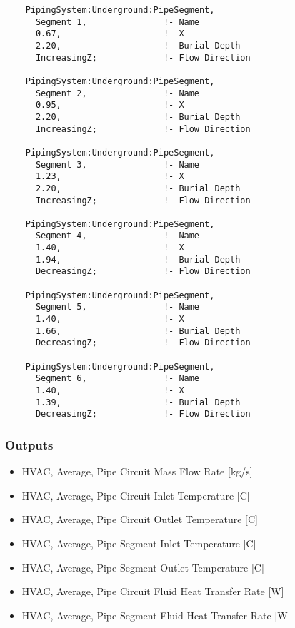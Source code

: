 \begin{lstlisting}
    PipingSystem:Underground:PipeSegment,
      Segment 1,               !- Name
      0.67,                    !- X
      2.20,                    !- Burial Depth
      IncreasingZ;             !- Flow Direction

    PipingSystem:Underground:PipeSegment,
      Segment 2,               !- Name
      0.95,                    !- X
      2.20,                    !- Burial Depth
      IncreasingZ;             !- Flow Direction

    PipingSystem:Underground:PipeSegment,
      Segment 3,               !- Name
      1.23,                    !- X
      2.20,                    !- Burial Depth
      IncreasingZ;             !- Flow Direction

    PipingSystem:Underground:PipeSegment,
      Segment 4,               !- Name
      1.40,                    !- X
      1.94,                    !- Burial Depth
      DecreasingZ;             !- Flow Direction

    PipingSystem:Underground:PipeSegment,
      Segment 5,               !- Name
      1.40,                    !- X
      1.66,                    !- Burial Depth
      DecreasingZ;             !- Flow Direction

    PipingSystem:Underground:PipeSegment,
      Segment 6,               !- Name
      1.40,                    !- X
      1.39,                    !- Burial Depth
      DecreasingZ;             !- Flow Direction
\end{lstlisting}

\subsubsection{Outputs}\label{outputs-9-004}

\begin{itemize}
\item
  HVAC, Average, Pipe Circuit Mass Flow Rate {[}kg/s{]}
\item
  HVAC, Average, Pipe Circuit Inlet Temperature {[}C{]}
\item
  HVAC, Average, Pipe Circuit Outlet Temperature {[}C{]}
\item
  HVAC, Average, Pipe Segment Inlet Temperature {[}C{]}
\item
  HVAC, Average, Pipe Segment Outlet Temperature {[}C{]}
\item
  HVAC, Average, Pipe Circuit Fluid Heat Transfer Rate {[}W{]}
\item
  HVAC, Average, Pipe Segment Fluid Heat Transfer Rate {[}W{]}
\end{itemize}

